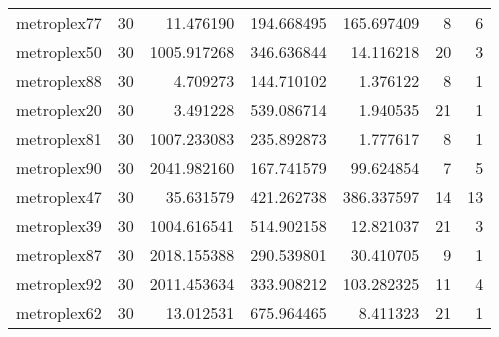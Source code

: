 \documentclass[../../../thesis.tex]{subfiles}
\begin{document}
\begin{longtable}{|l|r|r|r|r|r|r|}
metroplex77 & 30 & 11.476190 & 194.668495 & 165.697409 & 8 & 6 \\
metroplex50 & 30 & 1005.917268 & 346.636844 & 14.116218 & 20 & 3 \\
metroplex88 & 30 & 4.709273 & 144.710102 & 1.376122 & 8 & 1 \\
metroplex20 & 30 & 3.491228 & 539.086714 & 1.940535 & 21 & 1 \\
metroplex81 & 30 & 1007.233083 & 235.892873 & 1.777617 & 8 & 1 \\
metroplex90 & 30 & 2041.982160 & 167.741579 & 99.624854 & 7 & 5 \\
metroplex47 & 30 & 35.631579 & 421.262738 & 386.337597 & 14 & 13 \\
metroplex39 & 30 & 1004.616541 & 514.902158 & 12.821037 & 21 & 3 \\
metroplex87 & 30 & 2018.155388 & 290.539801 & 30.410705 & 9 & 1 \\
metroplex92 & 30 & 2011.453634 & 333.908212 & 103.282325 & 11 & 4 \\
metroplex62 & 30 & 13.012531 & 675.964465 & 8.411323 & 21 & 1 \\
\end{longtable}
\end{document}
